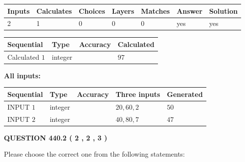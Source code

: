 \documentclass[12pt]{article}
\begin{document}
 
\noindent{}
 
 

 
   
   
   
   
\noindent\begin{tabular}{|l|l|l|l|l|l|l|}
 \hline
Inputs & Calculates & Choices & Layers & Matches & Answer & Solution \\ \hline
 2  & 
 1  & 
 0
  & 
 0  & 
 0  & 
  yes & 
  yes 
  \\ \hline
 \end{tabular}
   
   
   
   
\noindent{}
   
   
  
  
\noindent\begin{tabular}{|l|l|l|l|}
\hline
 Sequential & Type & Accuracy & Calculated \\ 
\hline
 
 
  Calculated $  1 $ & integer &  & 
  $ 97 $ 
 \\  \hline  
 \end{tabular}
   
   
   
   
\noindent\vspace{0.1in}\hspace{-0.08in} {\textbf{\Large{All inputs: }}}
   
   
  
  
\noindent\begin{tabular}{|l|l|l|l|l|}
\hline
 Sequential & Type & Accuracy & Three inputs & Generated \\ 
\hline
 
 
  INPUT $  1 $ & integer &  & $
 20
 , 
 60
 , 
 2
 $ & $ 50 $ 
 \\  \hline  
 
 
  INPUT $  2 $ & integer &  & $
 40
 , 
 80
 , 
 7
 $ & $ 47 $ 
 \\  \hline  
 \end{tabular}
   
   
  
\vspace{0.2in}
  
{\textbf{\Large{QUESTION
440.2 
 ( 2 , 2 , 3 )
}}}
  
  
Please choose the correct one from the following statements:
 
\end{document}
